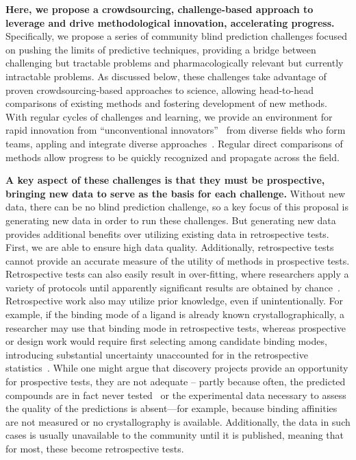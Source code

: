 \documentclass[11pt]{article}
\begin{document}
{\bf Here, we propose a crowdsourcing, challenge-based approach to leverage and drive methodological innovation, accelerating progress.} 
Specifically, we propose a series of community blind prediction challenges focused on pushing the limits of predictive techniques, providing a bridge between challenging but tractable problems and pharmacologically relevant but currently intractable problems.
As discussed below, these challenges take advantage of proven crowdsourcing-based approaches to science, allowing head-to-head comparisons of existing methods and fostering development of new methods.
With regular cycles of challenges and learning, we provide an environment for rapid innovation from ``unconventional innovators''~\cite{Kay:2011:R&DManage} from diverse fields who form teams, appling and integrate diverse approaches~\cite{Saez-Rodriguez:2016:NatRevGenet}.
Regular direct comparisons of methods allow progress to be quickly recognized and propagate across the field.

{\bf A key aspect of these challenges is that they must be prospective, bringing new data to serve as the basis for each challenge.}
Without new data, there can be no blind prediction challenge, so a key focus of this proposal is generating new data in order to run these challenges.
But generating new data provides additional benefits over utilizing existing data in retrospective tests.
First, we are able to ensure high data quality.
Additionally, retrospective tests cannot provide an accurate measure of the utility of methods in prospective tests. 
Retrospective tests can also easily result in over-fitting, where researchers apply a variety of protocols until apparently significant results are obtained by chance~\cite{Nuzzo:2015:Nature}.
Retrospective work also may utilize prior knowledge, even if unintentionally.  
For example, if the binding mode of a ligand is already known crystallographically, a researcher may use that binding mode in retrospective tests, whereas prospective or design work would require first selecting among candidate binding modes, introducing substantial uncertainty unaccounted for in the retrospective statistics~\cite{mobley_predicting_2007, boyce_predicting_2009, mobley_perspective_2012}.
While one might argue that discovery projects provide an opportunity for prospective tests, they are not adequate -- partly because often, the predicted compounds are in fact never tested~\cite{christ_binding_2016} or the experimental data necessary to assess the quality of the predictions is absent---for example, because binding affinities are not measured or no crystallography is available. 
Additionally, the data in such cases is usually unavailable to the community until it is published, meaning that for most, these become retrospective tests.
\end{document}
